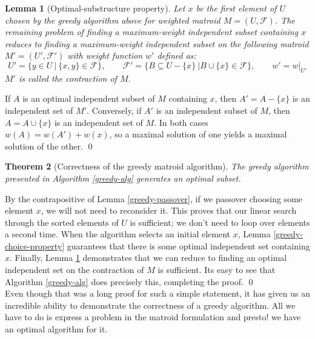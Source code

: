 \documentclass[10pt]{article}
\theoremstyle{plain}
\newtheorem{thm}{Theorem}[section] %
\newtheorem{lem}[thm]{Lemma}
\theoremstyle{definition}
\numberwithin{equation}{section}
\numberwithin{figure}{section}
\begin{document}
\begin{lem}[Optimal-substructure property]
Let $x$ be the first element of $U$ chosen by the greedy algorithm above for weighted matroid $M = (U, \mathcal{F})$. The remaining problem of finding a maximum-weight independent subset containing $x$ reduces to finding a maximum-weight independent subset on the following matroid $M' = (U', \mathcal{F}')$ with weight function $w'$ defined as:
\begin{equation}
U' = \{y \in U \ \vert \ \{x, y\} \in \mathcal{F} \}, \qquad \mathcal{F}' = \{B \subseteq U - \{x\} \ \vert B \cup \{x\} \in \mathcal{F}\}, \qquad w' = w \vert_{U'}
\end{equation} \label{greedy-substructure}
$M'$ is called the contraction of $M$.
\end{lem}

\proof If $A$ is an optimal independent subset of $M$ containing $x$, then $A' = A - \{x\}$ is an independent set of $M'$. Conversely, if $A'$ is an independent subset of $M$, then $A = A \cup \{x\}$ is an independent set of $M$. In both cases $w(A) = w(A') + w(x)$, so a maximal solution of one yields a maximal solution of the other. \qed

\begin{thm}[Correctness of the greedy matroid algorithm]
The greedy algorithm presented in Algorithm \ref{greedy-alg} generates an optimal subset.
\end{thm}

\proof By the contrapositive of Lemma \ref{greedy-passover}, if we passover choosing some element $x$, we will not need to reconsider it. This proves that our linear search through the sorted elements of $U$ is sufficient; we don't need to loop over elements a second time. When the algorithm selects an initial element $x$, Lemma \ref{greedy-choice-property} guarantees that there is some optimal independent set containing $x$. Finally, Lemma \ref{greedy-substructure} demonstrates that we can reduce to finding an optimal independent set on the contraction of $M$ is sufficient. Its easy to see that Algorithm \ref{greedy-alg} does precisely this, completing the proof. \qed \\

\noindent Even though that was a long proof for such a simple statement, it has given us an incredible ability to demonstrate the correctness of a greedy algorithm. All we have to do is express a problem in the matroid formulation and presto! we have an optimal algorithm for it. \\
\end{document}
